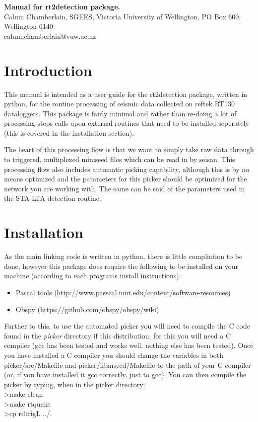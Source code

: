 \documentclass[a4paper,12pt,final]{article}
\begin{document}
\begin{center}
  \textbf{Manual for rt2detection package.}\\
   \vspace*{1\baselineskip}
  Calum Chamberlain, SGEES, Victoria University of Wellington, PO Box 600, Wellington 6140\\calum.chamberlain@vuw.ac.nz\\
  \vspace*{1\baselineskip}
  
\end{center} %

\section{Introduction}

This manual is intended as a user guide for the rt2detection package, written in python, for
the routine processing of seismic data collected on reftek RT130 dataloggers.  This package
is fairly minimal and rather than re-doing a lot of processing steps calls upon external
routines that need to be installed seperately (this is covered in the installation section).

The heart of this processing flow is that we want to simply take raw data through to triggered,
multiplexed miniseed files which can be read in by seisan.  This processing flow also includes
automatic picking capability, although this is by no means optimized and the parameters for this
picker should be optimized for the network you are working with.  The same can be said of the
parameters used in the STA-LTA detection routine.

\section{Installation}

As the main linking code is written in python, there is little compliation to be done, however
this package does require the following to be installed on your machine (according to each
programs install instructions):
\begin{itemize}
	\item Pascal tools (http://www.passcal.nmt.edu/content/software-resources)
	\item Obspy (https://github.com/obspy/obspy/wiki)
\end{itemize}

Further to this, to use the automated picker you will need to compile the C code found
in the \emph{picker} directory if this distribution, for this you will need a C compiler
(gcc has been tested and works well, nothing else has been tested).  Once you have
installed a C compiler you should change the variables in both picker/src/Makefile and 
picker/libmseed/Makefile to the path of your C compiler (or, if you have installed it gcc
correctly, just to gcc).  You can then compile the picker by typing, when in the picker
directory:\\
>make clean\\
>make rtquake\\
>cp rdtrigL ../.\\
\end{document}
